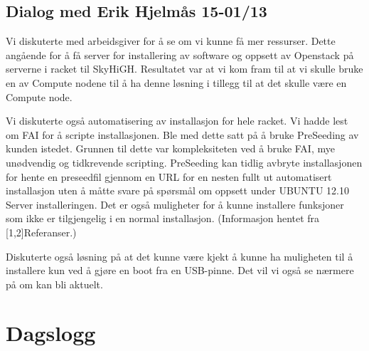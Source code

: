 \documentclass[12pt,a4paper]{article}
\begin{document}
\subsection{Dialog med Erik Hjelmås 15-01/13}
Vi diskuterte med arbeidsgiver for å se om vi kunne få mer ressurser. Dette angående for å få server for installering av software og oppsett av Openstack på serverne i racket til SkyHiGH. Resultatet var at vi kom fram til at vi skulle bruke en av Compute nodene til å ha denne løsning i tillegg til at det skulle være en Compute node. \newline \newline

Vi diskuterte også automatisering av installasjon for hele racket. Vi hadde lest om FAI for å scripte installasjonen. Ble med dette satt på å bruke PreSeeding av kunden istedet. Grunnen til dette var kompleksiteten ved å bruke FAI, mye unødvendig og tidkrevende scripting. PreSeeding kan tidlig avbryte installasjonen for hente en preseedfil gjennom en URL for en nesten fullt ut automatisert installasjon uten å måtte svare på spørsmål om oppsett under UBUNTU 12.10 Server installeringen. Det er også muligheter for å kunne installere funksjoner som ikke er tilgjengelig i en normal installasjon. (Informasjon hentet fra [1,2]Referanser.) \newline \newline

Diskuterte også løsning på at det kunne være kjekt å kunne ha muligheten til å installere kun ved å gjøre en boot fra en USB-pinne. Det vil vi også se nærmere på om kan bli aktuelt.
\newline \newline

\newpage
\section{Dagslogg}
\end{document}
